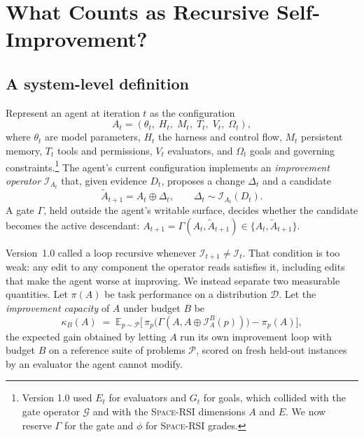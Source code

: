 \documentclass[11pt,a4paper]{article}
\newcommand{\spacersi}{\textsc{Space-RSI}}
\newcommand{\Imp}{\mathcal{I}}
\newcommand{\Gate}{\Gamma}
\begin{document}
\section{What Counts as Recursive Self-Improvement?}\label{sec:what}
\subsection{A system-level definition}\label{sec:def}
Represent an agent at iteration $t$ as the configuration
\begin{equation}
A_t = (\theta_t,\; H_t,\; M_t,\; T_t,\; V_t,\; \Omega_t),
\label{eq:agent}
\end{equation}
where $\theta_t$ are model parameters, $H_t$ the harness and control flow, $M_t$ persistent memory, $T_t$ tools and permissions, $V_t$ evaluators, and $\Omega_t$ goals and governing constraints.\footnote{Version 1.0 used $E_t$ for evaluators and $G_t$ for goals, which collided with the gate operator $\mathcal{G}$ and with the \spacersi{} dimensions $A$ and $E$. We now reserve $\Gamma$ for the gate and $\phi$ for \spacersi{} grades.} The agent's current configuration implements an \emph{improvement operator} $\Imp_{A_t}$ that, given evidence $D_t$, proposes a change $\Delta_t$ and a candidate
\begin{equation}
\tilde A_{t+1} = A_t \oplus \Delta_t, \qquad \Delta_t \sim \Imp_{A_t}(D_t).
\label{eq:propose}
\end{equation}
A gate $\Gate$, held outside the agent's writable surface, decides whether the candidate becomes the active descendant: $A_{t+1} = \Gate(A_t, \tilde A_{t+1}) \in \{A_t, \tilde A_{t+1}\}$.

Version~1.0 called a loop recursive whenever $\Imp_{t+1}\neq\Imp_t$. That condition is too weak: any edit to any component the operator reads satisfies it, including edits that make the agent worse at improving. We instead separate two measurable quantities. Let $\pi(A)$ be task performance on a distribution $\mathcal{D}$. Let the \emph{improvement capacity} of $A$ under budget $B$ be
\begin{equation}
\kappa_B(A) \;=\; \mathbb{E}_{p\sim\mathcal{P}}\Big[\,\pi_p\big(\Gate(A, A\oplus \Imp_A^{B}(p))\big) - \pi_p(A)\Big],
\label{eq:kappa}
\end{equation}
the expected gain obtained by letting $A$ run its own improvement loop with budget $B$ on a reference suite of problems $\mathcal{P}$, scored on fresh held-out instances by an evaluator the agent cannot modify.
\end{document}
